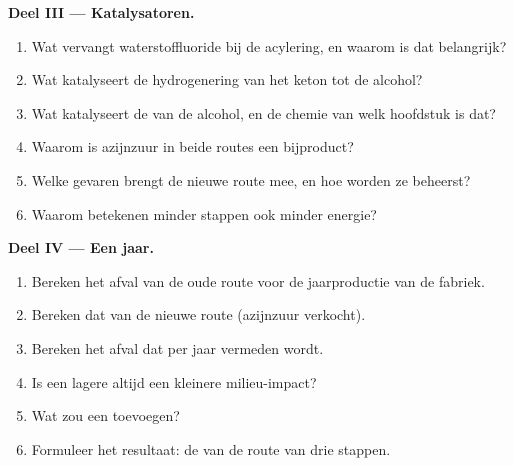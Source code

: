 \begin{problem}
\medskip\noindent\textbf{Deel III --- Katalysatoren.}
\begin{enumerate}[resume]
  \item Wat vervangt waterstoffluoride bij de acylering, en waarom is dat
        belangrijk?
  \item Wat katalyseert de hydrogenering van het keton tot de alcohol?
  \item Wat katalyseert de  van de alcohol, en de chemie van
        welk hoofdstuk is dat?
  \item Waarom is azijnzuur in beide routes een bijproduct?
  \item Welke gevaren brengt de nieuwe route mee, en hoe worden ze
        beheerst?
  \item Waarom betekenen minder stappen ook minder energie?
\end{enumerate}

\medskip\noindent\textbf{Deel IV --- Een jaar.}
\begin{enumerate}[resume]
  \item Bereken het afval van de oude route voor de jaarproductie van de
        fabriek.
  \item Bereken dat van de nieuwe route (azijnzuur verkocht).
  \item Bereken het afval dat per jaar vermeden wordt.
  \item Is een lagere  altijd een kleinere milieu-impact?
  \item Wat zou een  toevoegen?
  \item Formuleer het resultaat: de  van de route van drie
        stappen.
\end{enumerate}
\end{problem}
